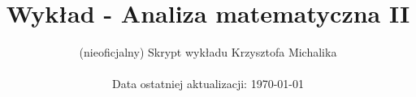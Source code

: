 \documentclass[12pt]{article}
\author{(nieoficjalny) Skrypt wykładu Krzysztofa Michalika \\ \\ Data ostatniej aktualizacji: \today}
\date{}
\title{Wykład - Analiza matematyczna II}
\begin{document}
\maketitle
\tableofcontents

\pagebreak


\pagebreak


\pagebreak


\pagebreak


\pagebreak


\pagebreak


\pagebreak


\pagebreak


\pagebreak
\end{document}
